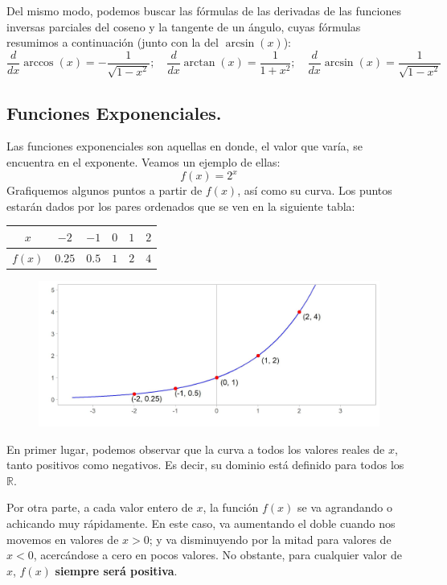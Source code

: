 \documentclass[12pt]{article}
\begin{document}
Del mismo modo, podemos buscar las fórmulas de las derivadas de las funciones inversas parciales del coseno y la tangente de un ángulo, cuyas fórmulas resumimos a continuación (junto con la del $\arcsin(x)$):
\[
\frac{d}{dx} \arccos(x) = - \frac{1}{\sqrt{1 - x^{2}}}; \quad \frac{d}{dx} \arctan(x) = \frac{1}{1 + x^{2}}; \quad \frac{d}{dx} \arcsin(x) = \frac{1}{\sqrt{1 - x^{2}}}
\]

\newpage



\subsection{Funciones Exponenciales.}

Las funciones exponenciales son aquellas en donde, el valor que varía, se encuentra en el exponente. Veamos un ejemplo de ellas:
\[f(x) = 2^{x}\]
Grafiquemos algunos puntos a partir de $f(x)$, así como su curva.
Los puntos estarán dados por los pares ordenados que se ven en la siguiente tabla:

\begin{table}[hbt!]
\centering

\begin{tabular}{c | c c c c c}
$x$ & $-2$ & $-1$ & $0$ & $1$ & $2$ \\
\hline
$f(x)$ & $0.25$ & $0.5$ & $1$ & $2$ & $4$
\end{tabular}

\end{table}


\begin{figure}[hbt!]
\centering
\includegraphics[scale=0.7]{img/exp_plot.jpg}
\end{figure}

En primer lugar, podemos observar que la curva a todos los valores reales de $x$, tanto positivos como negativos. Es decir, su dominio está definido para todos los $\mathbb{R}$.

Por otra parte, a cada valor entero de $x$, la función $f(x)$ se va agrandando o achicando muy rápidamente. En este caso, va aumentando el doble cuando nos movemos en valores de $x > 0$; y va disminuyendo por la mitad para valores de $x < 0$, acercándose a cero en pocos valores. No obstante, para cualquier valor de $x$, $f(x)$ \textbf{siempre será positiva}.
\end{document}
